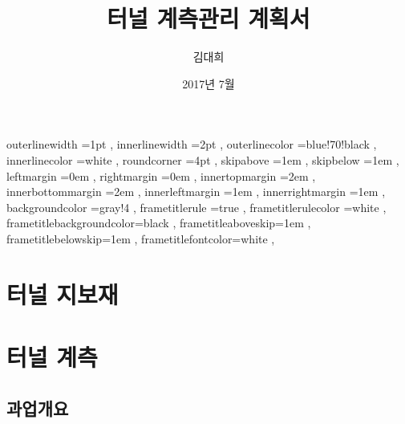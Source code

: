 \documentclass[12pt, a4paper, oneside]{book}
\begin{document}
	
			\dominitoc
			\doparttoc			




			\title{터널 계측관리 계획서}
			\author{김대희}
			\date{2017년 7월}
			\maketitle


			\tableofcontents 		%
			\cleardoublepage
			\listoftables 			%





		 {
						outerlinewidth		=1pt			,%
						innerlinewidth		=2pt			,%
						outerlinecolor		=blue!70!black	,%
						innerlinecolor		=white 			,%
						roundcorner			=4pt			,%
						skipabove			=1em 			,%
						skipbelow			=1em 			,%
						leftmargin			=0em			,%
						rightmargin			=0em			,%
						innertopmargin		=2em 			,%
						innerbottommargin 	=2em 			,%
						innerleftmargin		=1em 			,%
						innerrightmargin		=1em 			,%
						backgroundcolor		=gray!4			,%
						frametitlerule		=true 			,%
						frametitlerulecolor	=white			,%
						frametitlebackgroundcolor=black		,%
						frametitleaboveskip=1em 			,%
						frametitlebelowskip=1em 			,%
						frametitlefontcolor=white 			,%
						}


	

	\part{터널 지보재}
	\noptcrule
	\parttoc				


		






	\part{터널 계측}
	\noptcrule
	\parttoc				




	\chapter{과업개요}
	\minitoc				%
\end{document}
